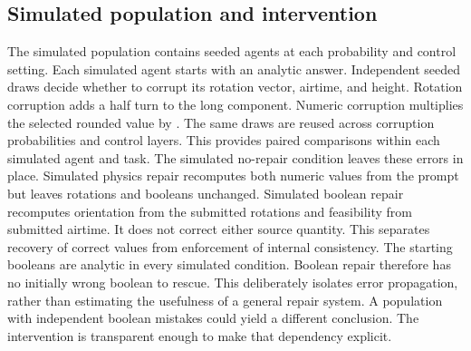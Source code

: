 \documentclass{article}
\begin{document}
\subsection{Simulated population and intervention}
The simulated population contains \SimAgentCount{} seeded agents at each probability and control setting. Each simulated agent starts with an analytic answer. Independent seeded draws decide whether to corrupt its rotation vector, airtime, and height. Rotation corruption adds a half turn to the long component. Numeric corruption multiplies the selected rounded value by \SimMultiplier{}. The same draws are reused across corruption probabilities and control layers. This provides paired comparisons within each simulated agent and task.
The simulated no-repair condition leaves these errors in place. Simulated physics repair recomputes both numeric values from the prompt but leaves rotations and booleans unchanged. Simulated boolean repair recomputes orientation from the submitted rotations and feasibility from submitted airtime. It does not correct either source quantity. This separates recovery of correct values from enforcement of internal consistency.
The starting booleans are analytic in every simulated condition. Boolean repair therefore has no initially wrong boolean to rescue. This deliberately isolates error propagation, rather than estimating the usefulness of a general repair system. A population with independent boolean mistakes could yield a different conclusion. The intervention is transparent enough to make that dependency explicit.

\begin{table}[ht]\centering\footnotesize\caption{Simulated population outcomes. Every bracket is a 95\% bootstrap interval over simulated agent seeds. Full means complete-answer fraction.}\end{table}
\end{document}
